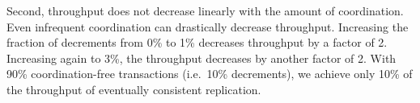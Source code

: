 \begin{benchmark}
  Second, throughput does not decrease linearly with the amount of
  coordination. Even infrequent coordination can drastically decrease
  throughput. Increasing the fraction of decrements from 0\% to 1\% decreases
  throughput by a factor of 2. Increasing again to 3\%, the throughput
  decreases by another factor of 2. With 90\% coordination-free transactions
  (i.e.\ 10\% decrements), we achieve only 10\% of the throughput of eventually
  consistent replication.

\end{benchmark}

%

